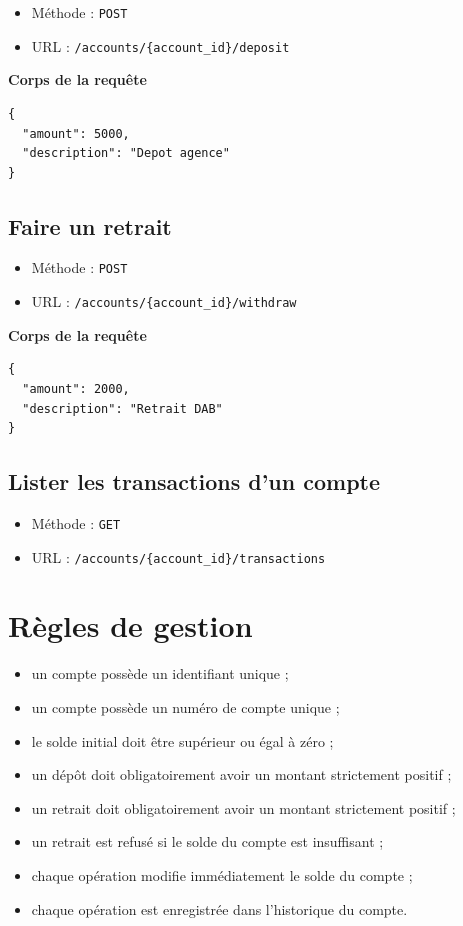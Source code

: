 \documentclass[12pt,a4paper]{article}
\begin{document}
\begin{itemize}
    \item Méthode : \texttt{POST}
    \item URL : \texttt{/accounts/\{account\_id\}/deposit}
\end{itemize}

\textbf{Corps de la requête}

\begin{verbatim}
{
  "amount": 5000,
  "description": "Depot agence"
}
\end{verbatim}

\subsection{Faire un retrait}

\begin{itemize}
    \item Méthode : \texttt{POST}
    \item URL : \texttt{/accounts/\{account\_id\}/withdraw}
\end{itemize}

\textbf{Corps de la requête}

\begin{verbatim}
{
  "amount": 2000,
  "description": "Retrait DAB"
}
\end{verbatim}

\subsection{Lister les transactions d'un compte}

\begin{itemize}
    \item Méthode : \texttt{GET}
    \item URL : \texttt{/accounts/\{account\_id\}/transactions}
\end{itemize}

\section{Règles de gestion}

\begin{itemize}
    \item un compte possède un identifiant unique ;
    \item un compte possède un numéro de compte unique ;
    \item le solde initial doit être supérieur ou égal à zéro ;
    \item un dépôt doit obligatoirement avoir un montant strictement positif ;
    \item un retrait doit obligatoirement avoir un montant strictement positif ;
    \item un retrait est refusé si le solde du compte est insuffisant ;
    \item chaque opération modifie immédiatement le solde du compte ;
    \item chaque opération est enregistrée dans l'historique du compte.
\end{itemize}
\end{document}
